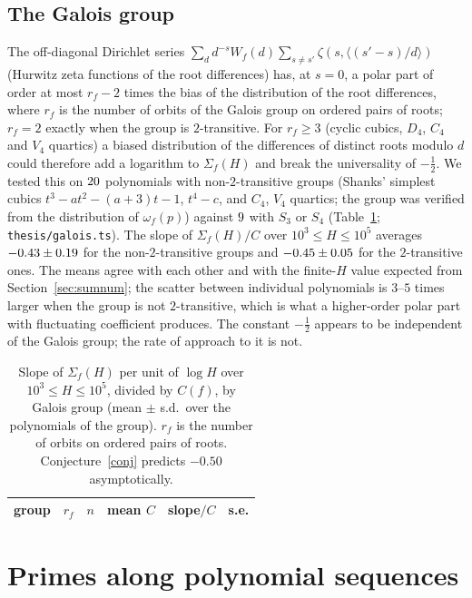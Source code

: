 \documentclass[11pt,a4paper]{article}
\theoremstyle{remark}\newtheorem{remark}[theorem]{Remark}
\begin{document}
\subsection{The Galois group}\label{sec:galois}

The off-diagonal Dirichlet series $\sum_dd^{-s}W_f(d)\sum_{s\ne s'}\zeta(s,\langle(s'-s)/d\rangle)$
(Hurwitz zeta functions of the root differences) has, at $s=0$, a polar part of order at most $r_f-2$
times the bias of the distribution of the root differences, where $r_f$ is the number of orbits of the
Galois group on ordered pairs of roots; $r_f=2$ exactly when the group is $2$-transitive. For
$r_f\ge3$ (cyclic cubics, $D_4$, $C_4$ and $V_4$ quartics) a biased distribution of the differences of
distinct roots modulo $d$ could therefore add a logarithm to $\Sigma_f(H)$ and break the universality
of $-\tfrac12$. We tested this on $20$ polynomials with non-$2$-transitive groups (Shanks' simplest
cubics $t^3-at^2-(a+3)t-1$, $t^4-c$, and $C_4$, $V_4$ quartics; the group was verified from the
distribution of $\omega_f(p)$) against $9$ with $S_3$ or $S_4$ (Table~\ref{tab:galois};
\texttt{thesis/galois.ts}). The slope of $\Sigma_f(H)/C$ over $10^3\le H\le10^5$ averages
$-0.43\pm0.19$ for the non-$2$-transitive groups and $-0.45\pm0.05$ for the
$2$-transitive ones. The means agree with each other and with the finite-$H$ value expected from
Section~\ref{sec:sumnum}; the scatter between individual polynomials is $3$--$5$ times larger when the
group is not $2$-transitive, which is what a higher-order polar part with fluctuating coefficient
produces. The constant $-\tfrac12$ appears to be independent of the Galois group; the rate of
approach to it is not.

\begin{table}[htbp]
\centering\small
\caption{Slope of $\Sigma_f(H)$ per unit of $\log H$ over $10^3\le H\le10^5$, divided by $C(f)$, by
Galois group (mean $\pm$ s.d.\ over the polynomials of the group). $r_f$ is the number of orbits on
ordered pairs of roots. Conjecture~\ref{conj} predicts $-0.50$ asymptotically.}\label{tab:galois}
\begin{tabular}{lrrrrr}
\toprule
group & $r_f$ & $n$ & mean $C$ & slope$/C$ & s.e.\\
\midrule

\end{tabular}
\end{table}

\FloatBarrier
\section{Primes along polynomial sequences}\label{sec:primes}
\end{document}
